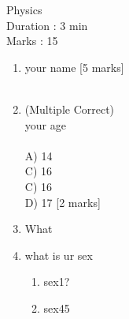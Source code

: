 \documentclass[12pt]{article}
\begin{document}
\vspace*{2cm}
\begin{center}
{\Huge Physics}\\ 
\vspace*{1cm}
{\Huge Duration : 3 min}\\ 
\vspace*{1cm}
{\Huge Marks : 15}\\ 
\vspace*{1cm}
\pagebreak 
\end{center}
\begin{enumerate}
\item {\large your name}
\hspace*{\fill} {\large [5 marks]} \\ \\ 
\vspace*{2cm}
\item {\large (Multiple Correct) \\ your age\\ \\ A) 14\\ C) 16\\ C) 16\\ D) 17} 
\hspace*{\fill} {\large [2 marks]}\vspace*{3.5cm}
\item {\large What}
\hspace*{\fill}{\large [0 marks]}\begin{enumerate}
\end{enumerate}
\item {\large what is ur sex}
\hspace*{\fill}{\large [8 marks]}\begin{enumerate}
\item {\large sex1?}
\hspace*{\fill}{\large [6 marks]}\vspace*{9.0cm}
\item {\large sex45}
\hspace*{\fill}{\large [2 marks]}\vspace*{3.0cm}
\end{enumerate}
\end{enumerate}
\end{document}
